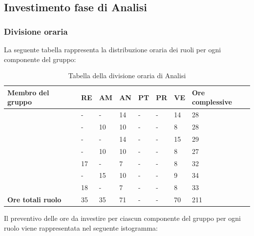 \subsection{Investimento fase di Analisi}

\subsubsection{Divisione oraria}
La seguente tabella rappresenta la distribuzione oraria dei ruoli per ogni componente del gruppo:
{

\renewcommand{\arraystretch}{2}
\begin{longtable}[h!] { C{3.3cm} C{1cm} C{1cm} C{1cm} C{1cm} C{1cm} C{1cm} C{2cm}}
\caption{Tabella della divisione oraria di Analisi}	\\
\rowcolor{\primaryColor}

\textcolor{\secondaryColor}{\textbf{Membro del gruppo}} & 
\textcolor{\secondaryColor}{\textbf{RE}} & 
\textcolor{\secondaryColor}{\textbf{AM}} & 
\textcolor{\secondaryColor}{\textbf{AN}} & 
\textcolor{\secondaryColor}{\textbf{PT}} & 
\textcolor{\secondaryColor}{\textbf{PR}} & 
\textcolor{\secondaryColor}{\textbf{VE}} & 
\textcolor{\secondaryColor}{\textbf{Ore complessive}}\\	
\endhead
\AW{}                     &  - &  - &  14 & - & - & 14 & 28 \\
\AT{}                     &  - &  10 & 10 & - & - & 8 & 28 \\
\AD{}                     &  - &  - &  14 & - & - & 15 & 29 \\
\EC{}                     &  - &  10 & 10 & - & - & 8 & 27 \\
\EM{}                     &  17 &  - & 7 & - & - & 8 & 32 \\
\FP{}                     &  - &  15 & 10 & - & - & 9 & 34 \\
\GG{}                     & 18 &  - &  7 & - & - & 8 & 33 \\
\textbf{Ore totali ruolo} & 35 & 35 & 71 & - & - & 70 & 211 \\

\end{longtable}
}
Il preventivo delle ore da investire per ciascun componente del gruppo per ogni ruolo viene rappresentata nel seguente istogramma:\\
